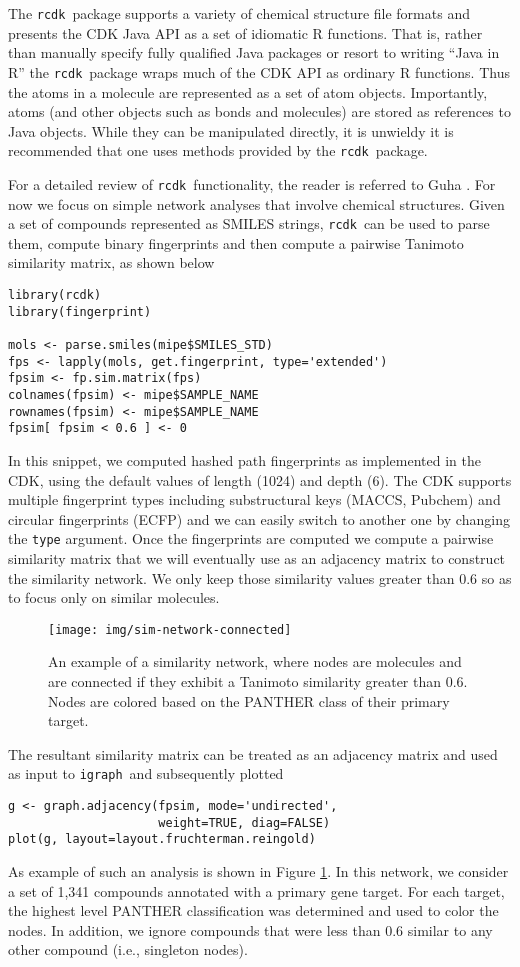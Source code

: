 \documentclass[]{book}
\newcommand{\rcdk}{\texttt{rcdk}\ }
\newcommand{\igraph}{\texttt{igraph}\ }
\begin{document}
The \rcdk package supports a variety of chemical structure file
formats and presents the CDK Java API as a set of idiomatic R
functions. That is, rather than manually specify fully qualified Java
packages or resort to writing ``Java in R'' the \rcdk package wraps
much of the CDK API as ordinary R functions. Thus the atoms in a
molecule are represented as a set of atom objects. Importantly, atoms
(and other objects such as bonds and molecules) are stored as
references to Java objects. While they can be manipulated directly, it
is unwieldy it is recommended that one uses methods provided by the
\rcdk package.

For a detailed review of \rcdk functionality, the reader is referred
to Guha \cite{Guha:2007aa}. For now we focus on simple network
analyses that involve chemical structures. Given a set of compounds
represented as SMILES strings, \rcdk can be used to parse them,
compute binary fingerprints and then compute a pairwise Tanimoto
similarity matrix, as shown below
\begin{lstlisting}
library(rcdk)
library(fingerprint)

mols <- parse.smiles(mipe$SMILES_STD)
fps <- lapply(mols, get.fingerprint, type='extended')
fpsim <- fp.sim.matrix(fps)
colnames(fpsim) <- mipe$SAMPLE_NAME
rownames(fpsim) <- mipe$SAMPLE_NAME
fpsim[ fpsim < 0.6 ] <- 0
\end{lstlisting}
In this snippet, we computed hashed path fingerprints as implemented
in the CDK, using the default values of length (1024) and depth
(6). The CDK supports multiple fingerprint types including
substructural keys (MACCS, Pubchem) and circular fingerprints (ECFP)
and we can easily switch to another one by changing the \texttt{type}
argument. Once the fingerprints are computed we compute a pairwise
similarity matrix that we will eventually use as an adjacency matrix
to construct the similarity network. We only keep those similarity
values greater than 0.6 so as to focus only on similar molecules.

\begin{figure}[h]
  \centering
  \texttt{[image: img/sim-network-connected]}
  \caption{An example of a similarity network, where nodes are
    molecules and are connected if they exhibit a Tanimoto similarity
    greater than 0.6. Nodes are colored based on the PANTHER
    \cite{Mi:2005qq} class of their primary target.}
  \label{fig:simnet}
\end{figure}

The resultant similarity matrix can be treated as an adjacency matrix
and used as input to \igraph and subsequently plotted
\begin{lstlisting}
g <- graph.adjacency(fpsim, mode='undirected', 
                     weight=TRUE, diag=FALSE)
plot(g, layout=layout.fruchterman.reingold)
\end{lstlisting}
As example of such an analysis is shown in Figure \ref{fig:simnet}. In
this network, we consider a set of 1,341 compounds annotated with a
primary gene target. For each target, the highest level PANTHER
\cite{Mi:2005qq} classification was determined and used to color the
nodes. In addition, we ignore compounds that were less than 0.6
similar to any other compound (i.e., singleton nodes).
\end{document}
